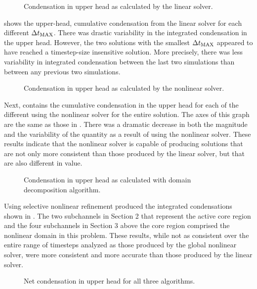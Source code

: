 \begin{figure}[h!tb]
\centering

\caption{Condensation in upper head as calculated by the linear solver.}
\label{fig:refillGammaLin}
\end{figure}

 shows the upper-head, cumulative condensation from the linear solver for each different $\dtmax{}$.
There was drastic variability in the integrated condensation in the upper head.
However, the two solutions with the smallest $\dtmax{}$ appeared to have reached a timestep-size insensitive solution.
More precisely, there was less variability in integrated condensation between the last two simulations than between any previous two simulations.

\begin{figure}[h!tb]
\centering

\caption{Condensation in upper head as calculated by the nonlinear solver.}
\label{fig:refillGammaNln}
\end{figure}

Next,  contains the cumulative condensation in the upper head for each of the different \dtmax{} using the nonlinear solver for the entire solution.
The axes of this graph are the same as those in .
There was a dramatic decrease in both the magnitude and the variability of the quantity as a result of using the nonlinear solver.
These results indicate that the nonlinear solver is capable of producing solutions that are not only more consistent than those produced by the linear solver, but that are also different in value.

\begin{figure}[h!tb]
\centering

\caption{Condensation in upper head as calculated with domain decomposition algorithm.}
\label{fig:refillGammaDom}
\end{figure}

Using selective nonlinear refinement produced the integrated condensations shown in .
The two subchannels in Section 2 that represent the active core region and the four subchannels in Section 3 above the core region comprised the nonlinear domain in this problem.
These results, while not as consistent over the entire range of timesteps analyzed as those produced by the global nonlinear solver, were more consistent and more accurate than those produced by the linear solver.

\begin{figure}[t!hb]
\centering

\caption{Net condensation in upper head for all three algorithms.}
\label{fig:refillMaxGamma}
\end{figure}


